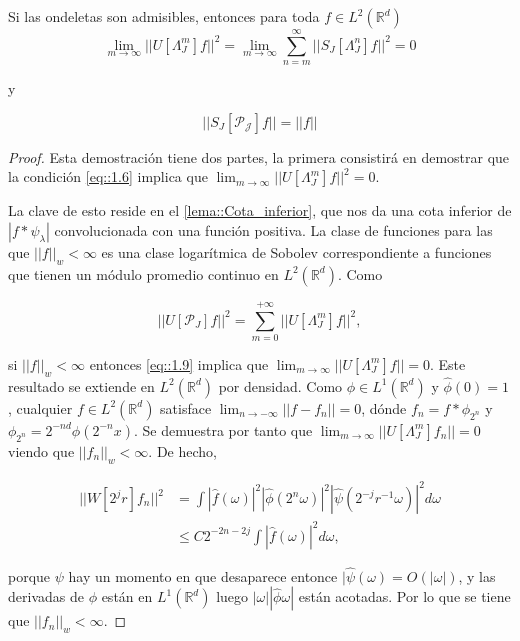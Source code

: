\begin{teorema} \label{teoremaOndeletasAdmisibles}
\noindent Si las ondeletas son admisibles, entonces para toda $f\in L^2(\mathbb{R}^d)$
\begin{equation}
  \lim_{m\rightarrow\infty} ||U[\Lambda_J^m]f||^2=\lim_{m\rightarrow\infty} \sum_{n=m}^{\infty} ||S_J[\Lambda_J^n]f||^2=0
\end{equation}

y

\begin{equation}
  ||S_J[\mathcal{P_J}]f||=||f||
\end{equation}

\end{teorema}

\begin{proof}
  Esta demostración tiene dos partes, la primera consistirá en demostrar que la condición \eqref{eq::1.6} implica que $\lim_{m\rightarrow \infty} ||U[\Lambda_J^m]f||^2=0$. 
  
  \medskip

  \noindent La clave de esto reside en el \autoref{lema::Cota_inferior}, que nos da una cota inferior de $|f\ast\psi_\lambda|$ convolucionada con una función positiva. La clase de funciones para las que $||f||_w < \infty$ es una clase logarítmica de Sobolev correspondiente a funciones que tienen un módulo promedio continuo en $L^2(\mathbb{R}^d)$. Como 

  $$ || U[\mathcal{P}_J]f ||^2= \sum_{m=0}^{+\infty} ||U[\Lambda_J^m]f||^2,$$

  \noindent si $||f||_w < \infty$ entonces \eqref{eq::1.9} implica que $\lim_{m\rightarrow\infty}||U[\Lambda_J^m]f||= 0$. Este resultado se extiende en $L^2(\mathbb{R}^d)$ por densidad. Como $\phi \in L^1(\mathbb{R}^d)$ y $\widehat{\phi}(0)=1$, cualquier $f\in L^2(\mathbb{R}^d)$ satisface $\lim_{n\rightarrow - \infty} ||f-f_n||=0$, dónde $f_n=f \ast \phi_{2^n}$ y $\phi_{2^n}=2^{-nd} \phi(2^{-n}x)$. Se demuestra por tanto que $\lim_{m\rightarrow \infty} ||U[\Lambda_J^m]f_n||=0$ viendo que $||f_n||_w < \infty$. De hecho, 


  \begin{align*}
      ||W[2^jr]f_n||^2 &= \int |\widehat{f}(\omega)|^2 |\widehat{\phi}(2^n \omega)|^2 |\widehat{\psi}(2^{-j}r^{-1}\omega)|^2 d\omega \\
      &\leq C 2^{-2n-2j} \int |\widehat{f}(\omega)|^2 d\omega,
  \end{align*}

  \noindent porque $\psi$ hay un momento en que desaparece entonce $|\widehat{\psi}(\omega)=O(|\omega|)$, y las derivadas de $\phi$ están en $L^1(\mathbb{R}^d)$ luego $|\omega||\widehat{\phi}\omega|$ están acotadas. Por lo que se tiene que $||f_n||_w < \infty$.


\end{proof}
